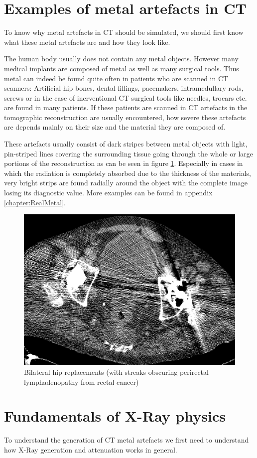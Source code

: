 \section{Examples of metal artefacts in CT}
\par To know why metal artefacts in CT should be simulated, we should first know what these metal artefacts are and how they look like.
\par The human body usually does not contain any metal objects. However many medical implants are composed of metal as well as many surgical tools. Thus metal can indeed be found quite often in patients who are scanned in CT scanners: Artificial hip bones, dental fillings, pacemakers, intramedullary rods, screws or in the case of inerventional CT surgical tools like needles, trocars etc. are found in many patients. If these patients are scanned in CT artefacts in the tomographic reconstruction are usually encountered, how severe these artefacts are depends mainly on their size and the material they are composed of.
\par These artefacts usually consist of dark stripes between metal objects with light, pin-striped lines covering the surrounding tissue going through the whole or large portions of the reconstruction as can be seen in figure \ref{BilateralHipReplacements}. Especially in cases in which the radiation is completely absorbed due to the thickness of the materials, very bright strips are found radially around the object with the complete image losing its diagnostic value. More examples can be found in appendix \ref{chapter:RealMetal}.
\begin{figure}[h!]
	\centering
	\includegraphics[width=0.5\linewidth]{images/12_FBP.png}
	\caption{Bilateral hip replacements (with streaks obscuring perirectal lymphadenopathy from rectal cancer)\cite{revisionrads}}
	\label{BilateralHipReplacements}
\end{figure}
\section{Fundamentals of X-Ray physics}
\par To understand the generation of CT metal artefacts we first need to understand how X-Ray generation and attenuation works in general.
